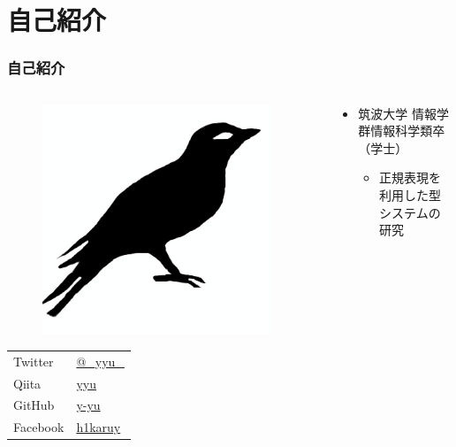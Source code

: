 \section{自己紹介}
\begin{frame}
  \frametitle{自己紹介}
  
  \begin{columns}
    \begin{column}{0.22\textwidth}
      \begin{center}
        \begin{figure}[h]
          \includegraphics[width=0.95\textwidth]{img/bird2x.png}%
        \end{figure}
      \end{center}
 
      \begin{table}[h]
        \begin{tabular}{ll}
          Twitter & \href{https://twitter.com/\_yyu\_}{@\_yyu\_} \\
          Qiita &  \href{https://qiita.com/yyu}{yyu} \\
          GitHub &  \href{https://github.com/y-yu}{y-yu} \\
          Facebook & \href{https://www.facebook.com/h1karuy}{h1karuy} \\
        \end{tabular}
      \end{table}
    \end{column}
    \begin{column}{0.78\textwidth}
      \pause
      \begin{itemize}
        \item 筑波大学 情報学群情報科学類卒（学士）
        \begin{itemize}
          \item 正規表現を利用した型システムの研究
        \end{itemize}


\end{itemize}
\end{column}
\end{columns}
\end{frame}
